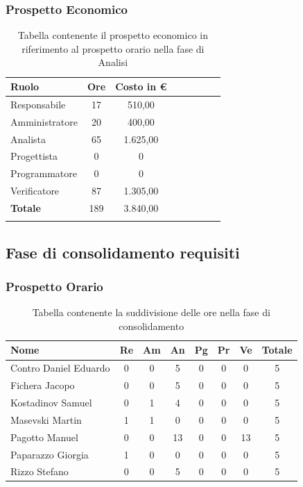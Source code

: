 \documentclass[../piano_di_progetto.tex]{subfiles}
\begin{document}
\subsubsection{Prospetto Economico}


\begin{longtable}{|l|c|c|c|c|c|c|c|}
	\hline
	\rowcolor{lightgray}
	\textbf{Ruolo} & \textbf{Ore} & \textbf{Costo in €}\\
	\endhead
	\hline
	Responsabile & 17 & 510,00 \\
	\hline
	Amministratore & 20 & 400,00 \\
	\hline
	Analista & 65 & 1.625,00 \\
	\hline
	Progettista & 0 & 0 \\
	\hline
	Programmatore & 0 & 0 \\
	\hline
	Verificatore & 87 & 1.305,00 \\
	\hline
	\textbf{Totale} & 189 & 3.840,00 \\
	\hline
	\caption{Tabella contenente il prospetto economico in riferimento al prospetto orario nella fase di Analisi} 
\end{longtable}


\subsection{ Fase di consolidamento requisiti}%
\label{sub:fase_cons}
\subsubsection{Prospetto Orario}

\begin{table}[!ht]

	\centering
	\begin{tabular}{|l|c|c|c|c|c|c|c|}
	\hline
	\rowcolor{lightgray}
	\textbf{Nome} & \textbf{Re} & \textbf{Am} & \textbf{An} & \textbf{Pg}  & \textbf{Pr}   & \textbf{Ve} & \textbf{Totale} \\
	\hline
		Contro Daniel Eduardo & 0 & 0 & 5 & 0 & 0 & 0  & 5 \\
	\hline
		Fichera Jacopo & 0 & 0 & 5 & 0 & 0 & 0 & 5 \\
	\hline
		Kostadinov Samuel & 0 & 1 & 4 & 0 & 0 & 0 & 5 \\			
	\hline
		Masevski Martin & 1 & 1 & 0 & 0 & 0 & 0 & 5 \\
	\hline
		Pagotto Manuel & 0 & 0 & 13 & 0 & 0 & 13 & 5 \\			
	\hline
		Paparazzo Giorgia & 1 & 0 & 0 & 0 & 0 & 0 & 5 \\
	\hline
		Rizzo Stefano & 0 & 0 & 5 & 0 & 0 & 0 & 5 \\
	\hline	
	\end{tabular}
	\caption{Tabella contenente la suddivisione delle ore nella fase di consolidamento}
\end{table}
\end{document}

